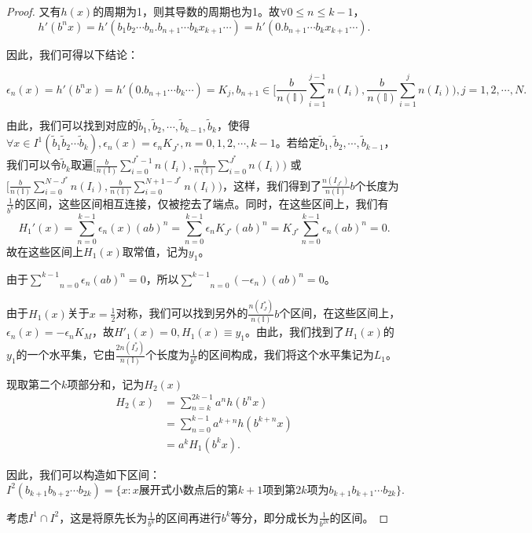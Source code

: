 \begin{proof}
又有$h(x)$的周期为1，则其导数的周期也为1。故$\forall0\le n\le k-1$，
$$
      h'(b^nx)=h'(b_1b_2\cdots b_n.b_{n+1}\cdots b_kx_{k+1}\cdots)=h'(0.b_{n+1}\cdots b_kx_{k+1}\cdots).
$$

因此，我们可得以下结论：

$$
      \epsilon_n(x)=h'(b^nx)=h'(0.b_{n+1}\cdots b_k\cdots)=            K_j,b_{n+1}\in{[}\frac{b}{n(\mathbb{I})}\sum_{i=1}^{j-1}n(I_i),\frac{b}{n(\mathbb{I})}\sum_{i=1}^{j}n(I_i){)},j=1,2,\cdots,N.
$$

由此，我们可以找到对应的$\tilde{b}_1,\tilde{b}_2,\cdots,\tilde{b}_{k-1},\tilde{b}_k$，使得$\forall x\in I^1(\tilde{b}_1\tilde{b}_2\cdots \tilde{b}_k),\epsilon_n(x)=\epsilon_nK_{J^*},n=0,1,2,\cdots,k-1$。若给定$\tilde{b}_1,\tilde{b}_2,\cdots,\tilde{b}_{k-1}$，我们可以令$\tilde{b}_k$取遍${[}\frac{b}{n(\mathbb{I})}\sum_{i=0}^{J^*-1}n(I_i),\frac{b}{n(\mathbb{I})}\sum_{i=0}^{J^*}n(I_i){)}$
或${[}\frac{b}{n(\mathbb{I})}\sum_{i=0}^{N-J^*}n(I_i),\frac{b}{n(\mathbb{I})}\sum_{i=0}^{N+1-J^*}n(I_i){)}$，这样，我们得到了$\frac{n(I_{J^*})}{n(\mathbb{I})}b$个长度为$\frac{1}{b^k}$的区间，这些区间相互连接，仅被挖去了端点。同时，在这些区间上，我们有
$$
      H_1'(x)=\sum_{n=0}^{k-1}\epsilon_n(x)(ab)^n=\sum_{n=0}^{k-1}\epsilon_nK_{J^*}(ab)^n=K_{J^*}\sum_{n=0}^{k-1}\epsilon_n(ab)^n=0.
$$
故在这些区间上$H_1(x)$取常值，记为$y_1$。

由于$\underset{n=0}{\overset{k-1}{\sum}}\epsilon_n(ab)^n=0$，所以$\underset{n=0}{\overset{k-1}{\sum}}(-\epsilon_n)(ab)^n=0$。

由于$H_1(x)$关于$x=\frac{1}{2}$对称，我们可以找到另外的$\frac{n(I_J^*)}{n(\mathbb{I})}b$个区间，在这些区间上，$\epsilon_n(x)=-\epsilon_nK_M$，故$H'_1(x)=0,H_1(x)\equiv y_1$。由此，我们找到了$H_1(x)$的$y_1$的一个水平集，它由$\frac{2n(I_J^*)}{n(\mathbb{I})}$个长度为$\frac{1}{b^k}$的区间构成，我们将这个水平集记为$L_1$。

现取第二个$k$项部分和，记为$H_2(x)$
$$
      \begin{aligned}
            H_2(x)&= \sum_{n=k}^{2k-1}a^nh(b^nx)\\
                  &= \sum_{n=0}^{k-1}a^{k+n}h(b^{k+n}x)\\
                  &= a^kH_1(b^kx).
      \end{aligned}
$$

因此，我们可以构造如下区间：
$$
      I^2(b_{k+1}b_{b+2}\cdots b_{2k})=\{x:x\mbox{展开式小数点后的第}k+1\mbox{项到第}2k\mbox{项为}b_{k+1}b_{k+1}\cdots b_{2k}\}.
$$

考虑$I^1\cap I^2$，这是将原先长为$\frac{1}{b^k}$的区间再进行$b^k$等分，即分成长为$\frac{1}{b^{2k}}$的区间。


\end{proof}
